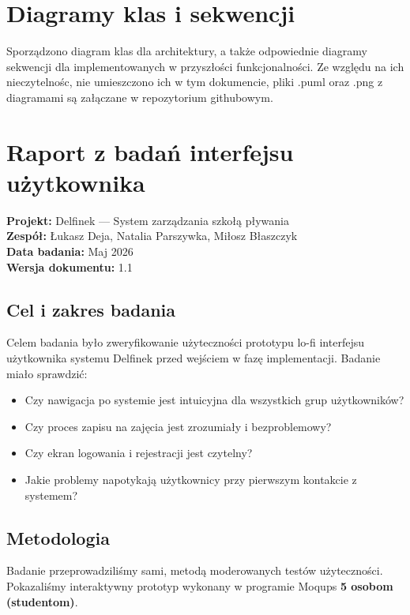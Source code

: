\documentclass[a4paper,12pt]{article}
\begin{document}
\section{Diagramy klas i sekwencji}

Sporządzono diagram klas dla architektury, a także odpowiednie diagramy sekwencji dla implementowanych w przyszłości funkcjonalności. Ze względu na ich nieczytelnośc, nie umieszczono ich w tym dokumencie, pliki .puml oraz .png z diagramami są załączane w repozytorium githubowym.

\section{Raport z badań interfejsu użytkownika}

\noindent\textbf{Projekt:} Delfinek --- System zarządzania szkołą pływania\\
\textbf{Zespół:} Łukasz Deja, Natalia Parszywka, Miłosz Błaszczyk\\
\textbf{Data badania:} Maj 2026\\
\textbf{Wersja dokumentu:} 1.1
 
\subsection{Cel i zakres badania}
 
Celem badania było zweryfikowanie użyteczności prototypu lo-fi interfejsu użytkownika systemu Delfinek przed wejściem w fazę implementacji. Badanie miało sprawdzić:
 
\begin{itemize}
    \item Czy nawigacja po systemie jest intuicyjna dla wszystkich grup użytkowników?
    \item Czy proces zapisu na zajęcia jest zrozumiały i bezproblemowy?
    \item Czy ekran logowania i rejestracji jest czytelny?
    \item Jakie problemy napotykają użytkownicy przy pierwszym kontakcie z systemem?
\end{itemize}
 
\subsection{Metodologia}
 
Badanie przeprowadziliśmy sami, metodą moderowanych testów użyteczności. Pokazaliśmy interaktywny prototyp wykonany w programie Moqups \textbf{5 osobom (studentom)}.
 
\end{document}
